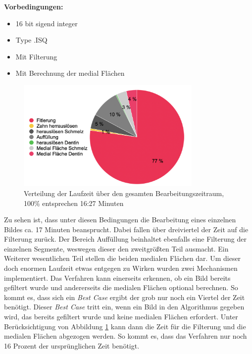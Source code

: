 \textbf{Vorbedingungen:}
\begin{itemize}
	\item 16 bit sigend integer

	\item Type .ISQ

	\item Mit Filterung

	\item Mit Berechnung der medial Flächen
\end{itemize}

\begin{figure}[h]
	\centering
	\includegraphics[width=0.8\textwidth]{img/laufzeit_diagramm.png}
	\caption{Verteilung der Laufzeit über den gesamten Bearbeitungszeitraum, 100\%
	entsprechen 16:27 Minuten}
	\label{fig:laufzeit}
\end{figure}

Zu sehen ist, dass unter diesen Bedingungen die Bearbeitung eines einzelnen Bildes
ca. 17 Minuten beansprucht. Dabei fallen über dreiviertel der Zeit auf die Filterung
zurück. Der Bereich Auffüllung beinhaltet ebenfalls eine Filterung der einzelnen
Segmente, weswegen dieser den zweitgrößten Teil ausmacht. Ein Weiterer
wesentlichen Teil stellen die beiden medialen Flächen dar. Um dieser doch enormen
Laufzeit etwas entgegen zu Wirken wurden zwei Mechanismen implementiert. Das
Verfahren kann einerseits erkennen, ob ein Bild bereits gefiltert wurde und andererseits
die medialen Flächen optional berechnen. So kommt es, dass sich ein \textit{Best
Case} ergibt der grob nur noch ein Viertel der Zeit benötigt. Dieser \textit{Best
Case} tritt ein, wenn ein Bild in den Algorithmus gegeben wird, das bereits
gefiltert wurde und keine medialen Flächen erfordert. Unter Berücksichtigung von
Abbildung \ref{fig:laufzeit} kann dann die Zeit für die Filterung und die medialen
Flächen abgezogen werden. So kommt es, dass das Verfahren nur noch 16 Prozent der
ursprünglichen Zeit benötigt.


